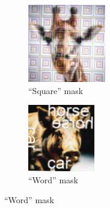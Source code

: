 \documentclass[a4paper, oneside]{discothesis}
\begin{document}
\begin{figure}[th]
	\hfill
	\begin{subfigure}[t]{0.19\textwidth}\centering\includegraphics[width=\linewidth]{figures/hcaptcha-square.png}\caption{``Square'' mask}\label{fig:subfig3}\end{subfigure}
	\hfill
	\begin{subfigure}[t]{0.19\textwidth}\centering\includegraphics[width=\linewidth]{figures/hcaptcha-word.png}\caption{``Word'' mask}\label{fig:subfig4}\end{subfigure}

\end{figure}
\end{document}
